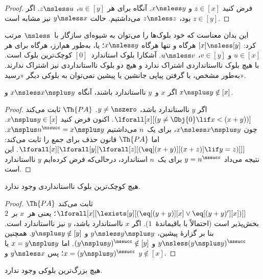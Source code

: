 \documentclass[../../../include/open-logic-section]{subfiles}
\begin{document}
\begin{proof}
فرض کنید $z \in [x]$ و $x \nsless y$. آنگاه برای هر $u \in [y]$،
$z \nsless u$. اگر $z \in [y]$ بود، $z \nsless z$ می‌داشتیم. حالت
$y \nsless x$ نیز مشابه است.
\end{proof}

\begin{explain}
این بدان معناست که خود بلوک‌ها را می‌توان به شیوه‌ای سازگار
با~$\nsless$ مرتب کرد: $[x] \nsless [y]$ هرگاه و تنها هرگاه
$x \nsless y$؛ یا، به‌طور هم‌ارز، هرگاه برای هر $u \in [x]$ و
$v \in [y]$، $u \nsless v$. آشکارا بلوک استاندارد~$[0]$ کوچک‌ترین
بلوک است. با هیچ بلوک نااستانداردی اشتراک ندارد و هیچ دو بلوک
نااستانداردی نیز اشتراک ندارند. به‌طور مشخص، با گرفتن پیاپی جانشین یا
پیشین نمی‌توان به بلوکی دیگر «رسید».
\end{explain}

\begin{prop}
اگر $x$ و~$y$ نااستاندارد باشند، آنگاه
$x \nsless x \nsplus y$ و $x \nsplus y \notin [x]$.
\end{prop}

\begin{proof}
اگر $y$ نااستاندارد باشد، $y \neq \nszero$. $\Th{PA}$ ثابت می‌کند
$\lforall[x][(y \neq \Obj{0} \lif x < (x+y))]$. اکنون فرض کنید
$x \nsplus y \in [x]$. چون $x \nsless x \nsplus y$، برای یک~$n$
می‌داشتیم $x \nsplus n^\nssucc = x \nsplus y$. اما $\Th{PA}$ قانون
حذف برای جمع را ثابت می‌کند:
$\lforall[x][\lforall[y][\lforall[z][(\eq[(x+y)][(x+z)] \lif y = z)]]]$.
این نتیجه می‌داد $y = n^\nssucc$ برای یک~$n$ استاندارد، درحالی‌که
فرض کرده‌ایم $y$ نااستاندارد است.
\end{proof}

\begin{prop}
هیچ کوچک‌ترین بلوک نااستانداردی وجود ندارد.
\end{prop}

\begin{proof}
$\Th{PA}$ ثابت می‌کند
$\lforall[x][\lexists[y][(\eq[(y+y)][x] \lor
      \eq[(y+y)'][x])]]$؛ یعنی هر~$x$ بر~$2$ بخش‌پذیر است (احتمالاً
با باقیماندهٔ~$1$). اگر $x$ نااستاندارد باشد، $y$ نیز نااستاندارد
است. بنا بر گزارهٔ پیشین، $y \nsless y \nsplus y$ و
$y \nsplus y \notin [y]$. همچنین
$y \nsless (y \nsplus y)^\nssucc$ و
$(y \nsplus y)^\nssucc \notin [y]$. اما
$x = y \nsplus y$ یا $x = (y \nsplus y)^\nssucc$؛ پس
$y \nsless x$ و $y \notin [x]$.
\end{proof}

\begin{prop}
هیچ بزرگ‌ترین بلوکی وجود ندارد.
\end{prop}
\end{document}
